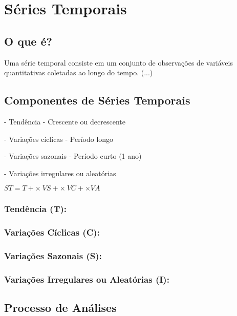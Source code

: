 \section{Séries Temporais \cite{torres}}

	\subsection{O que é?}

        Uma série temporal consiste em um conjunto de observações de variáveis quantitativas coletadas ao longo do tempo. (...)
        
    \subsection{Componentes de Séries Temporais}
    
        - Tendência - Crescente ou decrescente
        
        - Variações cíclicas - Período longo
        
        - Variações sazonais - Período curto (1 ano)
        
        - Variações irregulares ou aleatórias
        
        $ST = T + \times \ VS + \times \ VC + \times VA$
        
        \subsubsection{Tendência (T):}
        
        \subsubsection{Variações Cíclicas (C):}
        
        \subsubsection{Variações Sazonais (S):}
        
        \subsubsection{Variações Irregulares ou Aleatórias (I):}
        
    \subsection{Processo de Análises}
    
